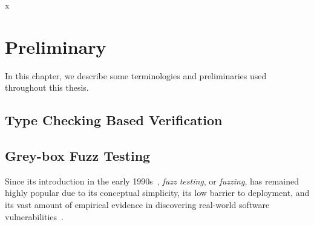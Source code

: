 x\chapter{Preliminary} \label{ch:preliminary}

In this chapter, we describe some terminologies and preliminaries used throughout this thesis.

\section{Type Checking Based Verification}

\section{Grey-box Fuzz Testing}
Since its introduction in the early 1990s~\cite{fuzzing1990}, \emph{fuzz testing}, or \emph{fuzzing}, has remained highly popular due to its conceptual simplicity, its low barrier to deployment, and its vast amount of empirical evidence in discovering real-world software vulnerabilities~\cite{fuzz_survey}.

